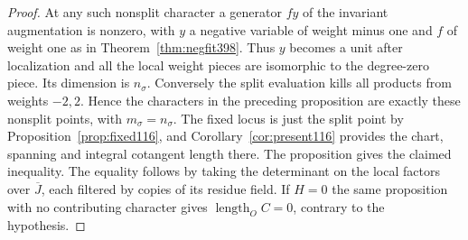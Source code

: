 \documentclass[a4paper,11pt]{article}
\theoremstyle{definition}
\theoremstyle{remark}
\numberwithin{equation}{section}
\begin{document}
\begin{proof}
At any such nonsplit character a generator \(fy\) of the invariant
augmentation is nonzero, with \(y\) a negative variable of weight
minus one and \(f\) of weight one as in Theorem~\ref{thm:negfit398}.
Thus \(y\) becomes a unit after localization and all the local
weight pieces are isomorphic to the degree-zero piece. Its
dimension is \(n_\sigma\). Conversely the split evaluation kills
all products from weights \(-2,2\). Hence the characters in the
preceding proposition are exactly these nonsplit points, with
\(m_\sigma=n_\sigma\). The fixed locus is just the split point by
Proposition~\ref{prop:fixed116}, and Corollary~\ref{cor:present116}
provides the chart, spanning and integral cotangent length there.
The proposition gives the claimed inequality. The equality follows
by taking the determinant on the local factors over \(\overline J\),
each filtered by copies of its residue field. If \(H=0\) the same
proposition with no contributing character gives
\(\operatorname{length}_O C=0\), contrary to the hypothesis.
\end{proof}
\end{document}
